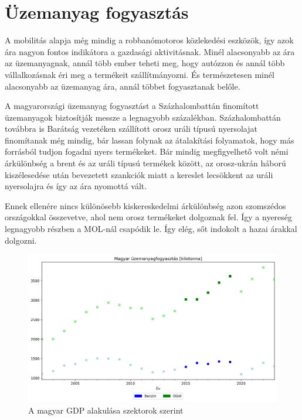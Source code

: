 \section{Üzemanyag fogyasztás}

A mobilitás alapja még mindig a robbanómotoros közlekedési eszközök, így azok ára nagyon fontos
indikátora a gazdasági aktivitásnak. Minél alacsonyabb az ára az üzemanyagnak, annál több ember
teheti meg, hogy autózzon és annál több vállalkozásnak éri meg a termékeit szállítmányozni. És
természetesen minél alacsonyabb az üzemanyag ára, annál többet fogyasztanak belőle.

A magyarországi üzemanyag fogyasztást a Százhalombattán finomított üzemanyagok biztosítják messze a
legnagyobb százalékban. Százhalombattán továbbra is Barátság vezetéken szállított orosz uráli
típusú nyersolajat finomítanak még mindig, bár lassan folynak az átalakítási folyamatok, hogy más
forrásból tudjon fogadni nyers termékeket. Bár mindig megfigyelhető volt némi árkülönbség a brent
és az uráli típusú termékek között, az orosz-ukrán háború kiszélesedése után bevezetett szankciók
miatt a kereslet lecsökkent az uráli nyersolajra és így az ára nyomottá vált.

Ennek ellenére nincs különösebb kiskereskedelmi árkülönbség azon szomszédos országokkal összevetve,
ahol nem orosz termékeket dolgoznak fel. Így a nyereség legnagyobb részben a MOL-nál csapódik le.
Így elég, sőt indokolt a hazai árakkal dolgozni.

\begin{figure}[htbp]
    \centering
    \includegraphics[width=1\textwidth, height=0.8\textheight, keepaspectratio]{../figures/petrol_consumption.png}
    \caption{A magyar GDP alakulása szektorok szerint}\label{fig:petrol_consumption}
\end{figure}

